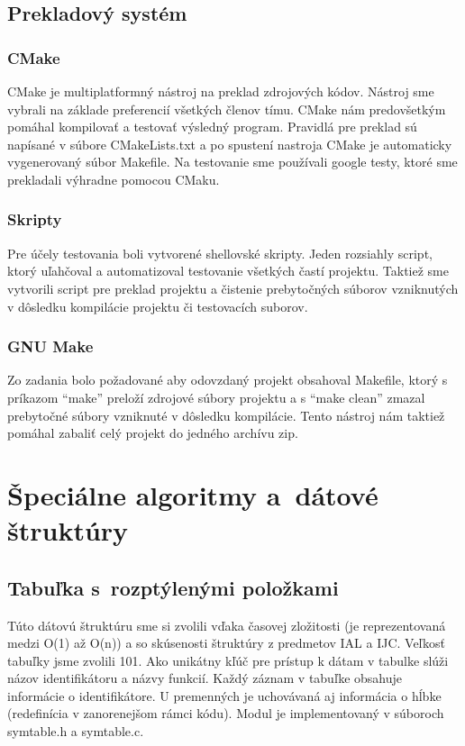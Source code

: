 \documentclass[a4paper, 11pt]{article}
\begin{document}
    \subsection{Prekladový systém}
    \subsubsection{CMake}
    CMake je multiplatformný nástroj na preklad zdrojových kódov. Nástroj sme vybrali na základe preferencií všetkých
    členov tímu. CMake nám predovšetkým pomáhal kompilovať a testovať výsledný program. Pravidlá pre preklad sú napísané v súbore
    CMakeLists.txt a po spustení nastroja CMake je automaticky vygenerovaný súbor Makefile.
    Na testovanie sme používali google testy, ktoré sme prekladali výhradne pomocou CMaku.

    \subsubsection{Skripty}
    Pre účely testovania boli vytvorené shellovské skripty. Jeden rozsiahly script, ktorý uľahčoval a automatizoval
    testovanie všetkých častí projektu. Taktiež sme vytvorili script pre preklad projektu a čistenie prebytočných súborov
    vzniknutých v dôsledku kompilácie projektu či testovacích suborov.

    \subsubsection{GNU Make}
    Zo zadania bolo požadované aby odovzdaný projekt obsahoval Makefile, ktorý s príkazom
    “make” preloží zdrojové súbory projektu a s “make clean” zmazal prebytočné súbory vzniknuté v dôsledku kompilácie.
    Tento nástroj nám taktiež pomáhal zabaliť celý projekt do jedného archívu zip.





    \section{Špeciálne algoritmy a~dátové štruktúry}

    \subsection{Tabuľka s~rozptýlenými položkami}
    Túto dátovú štruktúru sme si zvolili vďaka časovej zložitosti
    (je reprezentovaná medzi O(1) až O(n)) a so skúsenosti štruktúry z
    predmetov IAL a IJC. Veľkosť tabuľky jsme zvolili 101.
    Ako unikátny kľúč pre prístup k dátam v tabulke slúži názov identifikátoru a názvy funkcií.
    Každý záznam v tabuľke obsahuje informácie o identifikátore. U premenných je uchovávaná aj informácia
    o hĺbke (redefinícia v zanorenejšom rámci kódu). Modul je implementovaný v súboroch
    symtable.h a symtable.c.
\end{document}
